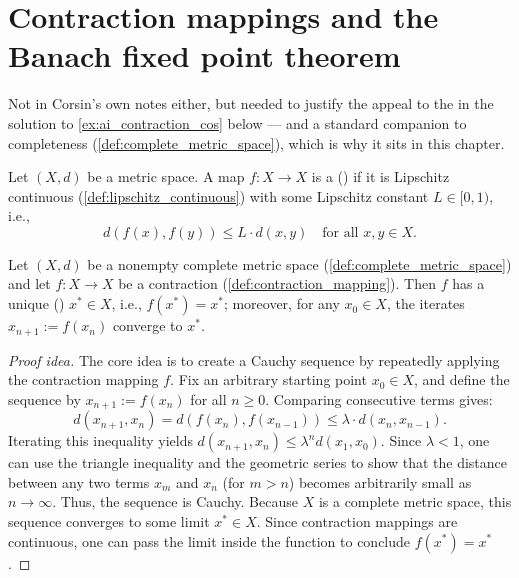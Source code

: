 
\section{Contraction mappings and the Banach fixed point theorem}
\label{sec:banach_fixed_point}

\begin{ainote}
Not in Corsin's own notes either, but needed to justify the appeal to the  in the solution to \cref{ex:ai_contraction_cos} below --- and a standard companion
to completeness (\cref{def:complete_metric_space}), which is why it sits in this chapter.
\end{ainote}

\begin{definition}
\label{def:contraction_mapping}
Let $(X,d)$ be a metric space. A map $f : X \to X$ is a 
() if it is Lipschitz continuous (\cref{def:lipschitz_continuous}) with
some Lipschitz constant $L \in [0,1)$, i.e.,
\[d(f(x),f(y)) \leq L \cdot d(x,y) \quad \text{for all } x,y \in X.\]
\end{definition}

\begin{theorem}
\label{thm:banach_fixed_point}
Let $(X,d)$ be a nonempty complete metric space (\cref{def:complete_metric_space}) and let
$f : X \to X$ be a contraction (\cref{def:contraction_mapping}). Then $f$ has a unique
 () $x^* \in X$, i.e., $f(x^*) = x^*$; moreover, for any
$x_0 \in X$, the iterates $x_{n+1} := f(x_n)$ converge to $x^*$.
\end{theorem}

\begin{proof}[Proof idea]
The core idea is to create a Cauchy sequence by repeatedly applying the contraction mapping $f$.
Fix an arbitrary starting point $x_0 \in X$, and define the sequence by $x_{n+1} := f(x_n)$ for all $n \geq 0$.
Comparing consecutive terms gives:
\[
d(x_{n+1}, x_n) = d(f(x_n), f(x_{n-1})) \leq \lambda \cdot d(x_n, x_{n-1}).
\]
Iterating this inequality yields $d(x_{n+1}, x_n) \leq \lambda^n d(x_1, x_0)$. Since $\lambda < 1$, one can use the triangle inequality and the geometric series to show that the distance between any two terms $x_m$ and $x_n$ (for $m > n$) becomes arbitrarily small as $n \to \infty$. Thus, the sequence is Cauchy.
Because $X$ is a complete metric space, this sequence converges to some limit $x^* \in X$. Since contraction mappings are continuous, one can pass the limit inside the function to conclude $f(x^*) = x^*$.
\end{proof}

